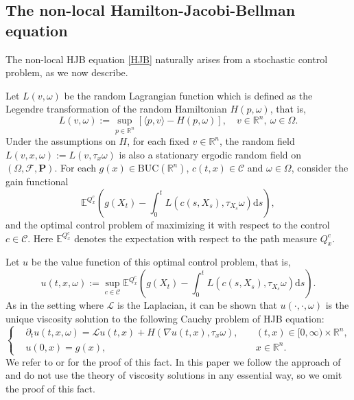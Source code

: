 \documentclass[11pt,reqno]{amsart}
\theoremstyle{definition}
\theoremstyle{remark}
\numberwithin{equation}{section}
\def\BUC{\mathrm{BUC}}
\def\bP{\mathbf{P}}
\begin{document}
\subsection{The non-local Hamilton-Jacobi-Bellman equation}
The non-local HJB equation \eqref{HJB} naturally arises from a stochastic control problem, as we now describe. 

Let $L(v,\omega)$ be the random Lagrangian function which is defined as the Legendre transformation of the random Hamiltonian $H(p,\omega)$, that is,
\begin{equation}
    L(v,\omega):= \sup_{p\in\mathbb{R}^n}[\langle p, v \rangle - H(p,\omega)], \quad v\in\mathbb{R}^n,\ \omega\in\Omega.
\end{equation}
Under the assumptions on $H$, for each fixed $v\in\mathbb{R}^n$, the random field $L(v,x,\omega) := L(v,\tau_x\omega)$ is also a stationary ergodic random field on $(\Omega, \mathscr{F}, \bP)$.
For each $g(x)\in \BUC(\mathbb{R}^n)$, $c(t,x)\in\mathscr{C}$ and $\omega\in \Omega$, consider the gain functional
\begin{equation}
    \mathbb{E}^{Q^c_x}\left( g(X_t) - \int^{t}_0 L(c(s,X_s),\tau_{X_s}\omega)\mathrm{d}s \right),
\end{equation}
and the optimal control problem of maximizing it with respect to the control $c \in \mathscr{C}$. Here $\mathbb{E}^{Q^{c}_{x}}$ denotes the expectation with respect to the path measure $Q^{c}_{x}$.

Let $u$ be the value function of this optimal control problem, that is,
\begin{equation}
\label{eq:HJBcontrol}
    u(t,x,\omega):= \sup_{c\in\mathscr{C}}\mathbb{E}^{Q^{c}_{x}}\left( g(X_t) - \int^{t}_0 L(c(s,X_s),\tau_{X_s}\omega)\mathrm{d}s \right).
\end{equation}
As in the setting where $\mathscr{L}$ is the Laplacian, it can be shown that $u(\cdot,\cdot,\omega)$ is the unique viscosity solution to the following Cauchy problem of HJB equation:
\begin{equation}\label{HJBu}
  \left\{
   \begin{aligned}
   & \partial_t u(t,x,\omega) =  \mathscr{L} u(t,x) + H(\nabla u(t,x), \tau_{x}\omega ),\quad & (t,x) \in [0,\infty)\times\mathbb{R}^n, \\
   &  u(0,x) = g(x), \quad & x\in \mathbb{R}^n.
   \end{aligned}
   \right.
\end{equation}
We refer to \cite[Theorem 3.4]{GB97} or \cite[Theorem 4.1]{LP09} for the proof of this fact. In this paper we follow the approach of \cite{KRV06,KV-HJB} and do not use the theory of viscosity solutions in any essential way, so we omit the proof of this fact.
\end{document}
